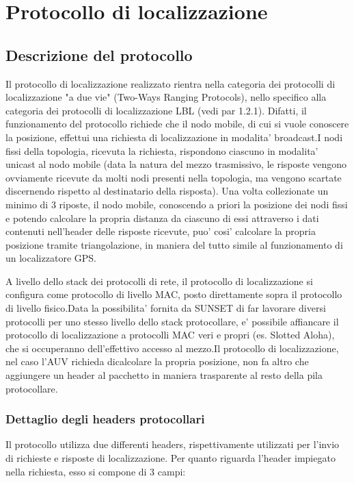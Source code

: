 \chapter{Protocollo di localizzazione}

\section{Descrizione del protocollo}
Il protocollo di localizzazione realizzato rientra nella categoria dei protocolli di localizzazione "a due vie" (Two-Ways Ranging Protocols), nello specifico alla categoria dei protocolli di localizzazione LBL (vedi par 1.2.1). Difatti, il funzionamento del protocollo richiede che il nodo mobile, di cui si vuole conoscere la posizione, effettui una richiesta di localizzazione in modalita' broadcast.\newline I nodi fissi della topologia, ricevuta la richiesta, rispondono ciascuno in modalita' unicast al nodo mobile (data la natura del mezzo trasmissivo, le risposte vengono ovviamente ricevute da molti nodi presenti nella topologia, ma vengono scartate discernendo rispetto al destinatario della risposta). \newline Una volta collezionate un minimo di 3 riposte, il nodo mobile, conoscendo a priori la posizione dei nodi fissi e potendo calcolare la propria distanza da ciascuno di essi attraverso i dati contenuti nell'header delle risposte ricevute, puo' cosi' calcolare la propria posizione tramite triangolazione, in maniera del tutto simile al funzionamento di un localizzatore GPS.\newline

A livello dello stack dei protocolli di rete, il protocollo di localizzazione si configura come protocollo di livello MAC, posto direttamente sopra il protocollo di livello fisico.\newline Data la possibilita' fornita da SUNSET di far lavorare diversi protocolli per uno stesso livello dello stack protocollare, e' possibile affiancare il protocollo di localizzazione a protocolli MAC veri e propri (es. Slotted Aloha), che si occuperanno dell'effettivo accesso al mezzo.\newline Il protocollo di localizzazione, nel caso l'AUV richieda dicalcolare la propria posizione, non fa altro che aggiungere un header al pacchetto in maniera trasparente al resto della pila protocollare.

\subsection{Dettaglio degli headers protocollari}
Il protocollo utilizza due differenti headers, rispettivamente utilizzati per l'invio di richieste e risposte di localizzazione.
Per quanto riguarda l'header impiegato nella richiesta, esso si compone di 3 campi:\newline

